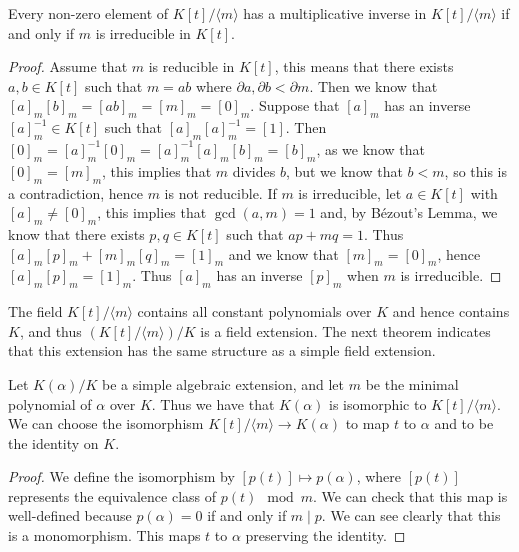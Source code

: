 \begin{theorem} \label{thm:irreducible-mod-field}
	Every non-zero element of $K[t] /\langle m\rangle$ has a multiplicative inverse in $K[t] /\langle m\rangle$ if and only if $m$ is irreducible in $K[t]$.
\end{theorem}

\begin{proof}
	Assume that \(m\) is reducible in \(K[t]\), this means that there exists \(a,b \in K[t]\) such that \(m = ab\) where \(\partial a,\partial b < \partial m\). Then we know that \([a]_m[b]_m = [ab]_m = [m]_m = [0]_m\). Suppose that \([a]_m\) has an inverse \([a]_m^{-1} \in K[t]\) such that \([a]_m[a]_m^{-1} = [1]\). Then \([0]_m = [a]_m^{-1}[0]_m = [a]_m^{-1}[a]_m[b]_m = [b]_m\), as we know that \([0]_m = [m]_m\), this implies that \(m\) divides \(b\), but we know that \(b < m\), so this is a contradiction, hence \(m\) is not reducible. 
	If \(m\) is irreducible, let \(a \in K[t]\) with \([a]_m \neq [0]_m\), this implies that \(\gcd(a,m)=1\) and, by Bézout's Lemma, we know that there exists \(p,q \in K[t]\) such that \(ap + mq = 1\). Thus \([a]_m[p]_m + [m]_m[q]_m = [1]_m\) and we know that \([m]_m = [0]_m\), hence \([a]_m[p]_m = [1]_m\). Thus \([a]_m\) has an inverse \([p]_m\) when \(m\) is irreducible.
\end{proof}

The field $K[t] / \langle m \rangle$ contains all constant polynomials over $K$ and hence contains $K$, and thus $\left(K[t] / \langle m \rangle \right) / K$ is a field extension. The next theorem indicates that this extension has the same structure as a simple field extension.

\begin{theorem}
 Let $K(\alpha) / K$ be a simple algebraic extension, and let \(m\) be the minimal polynomial of \(\alpha\) over \(K\). Thus we have that $K(\alpha)$ is isomorphic to $K[t] /\langle m\rangle$. We can choose the isomorphism $K[t] /\langle m\rangle \rightarrow K(\alpha)$ to map $t$ to $\alpha$ and to be the identity on $K$.
\end{theorem}

\begin{proof}
We define the isomorphism by $[p(t)] \mapsto p(\alpha)$, where $[p(t)]$ represents the equivalence class of $p(t)\mod m$. We can check that this map is well-defined because $p(\alpha)=0$ if and only if $m \mid p$. We can see clearly that this is a monomorphism. This maps \(t\) to \(\alpha\) preserving the identity.
\end{proof}

